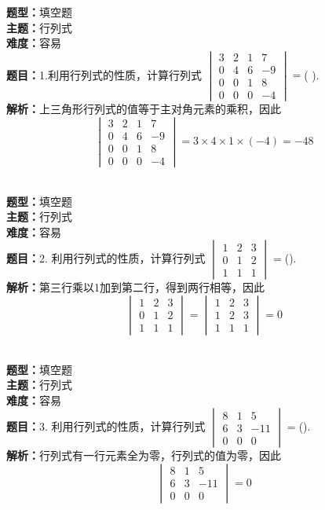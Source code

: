\documentclass{ctexart}
\newenvironment{question}[5]{%
	\noindent\textbf{题型：}#1\\
	\textbf{主题：}#2\\
	\textbf{难度：}#3\\
	\textbf{题目：}#4\\
	\textbf{解析：}#5\\
	\vspace{1em}
}{}
\begin{document}
	\begin{question}
		{填空题}
		{行列式}
		{容易}
		{1.利用行列式的性质，计算行列式 \(\begin{vmatrix}3 & 2 & 1 & 7 \\ 0 & 4 & 6 & -9 \\ 0 & 0 & 1 & 8 \\ 0 & 0 & 0 & -4\end{vmatrix}=\)(  ).}
		{上三角形行列式的值等于主对角元素的乘积，因此\[
			\begin{vmatrix}
				3 & 2 & 1 & 7 \\
				0 & 4 & 6 & -9 \\
				0 & 0 & 1 & 8 \\
				0 & 0 & 0 & -4
			\end{vmatrix}=3 \times 4 \times 1 \times(-4)=-48
			\]}
	\end{question}	
	
	\begin{question}
		{填空题}
		{行列式}
		{容易}
		{2. 利用行列式的性质，计算行列式 \(\begin{vmatrix}1 & 2 & 3 \\ 0 & 1 & 2 \\ 1 & 1 & 1\end{vmatrix}=\)(\qquad). }
		{第三行乘以1加到第二行，得到两行相等，因此
			\[
			\begin{vmatrix}
				1 & 2 & 3 \\
				0 & 1 & 2 \\
				1 & 1 & 1
			\end{vmatrix}
			=\begin{vmatrix}
				1 & 2 & 3 \\
				1 & 2 & 3 \\
				1 & 1 & 1
			\end{vmatrix}=0
			\]}
	\end{question}
	
	\begin{question}
		{填空题}
		{行列式}
		{容易}
		{3. 利用行列式的性质，计算行列式 \(\begin{vmatrix}8 & 1 & 5 \\ 6 & 3 & -11 \\ 0 & 0 & 0\end{vmatrix}=\)(\qquad). }
		{行列式有一行元素全为零，行列式的值为零，因此
			\[
			\begin{vmatrix}
				8 & 1 & 5 \\
				6 & 3 & -11 \\
				0 & 0 & 0
			\end{vmatrix}=0
			\]}
	\end{question}
	
\end{document}
